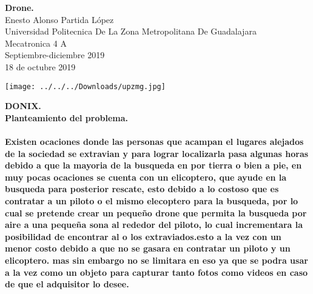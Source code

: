 \documentclass[12pt]{report}
\begin{document}
{\Large \textbf{Drone.}\\}
\Large{Enesto Alonso Partida López\\ Universidad Politecnica De La Zona Metropolitana De Guadalajara\\ Mecatronica 4 A\\ Septiembre-diciembre 2019}\\
{18 de octubre 2019 }\\

\begin{center}
\texttt{[image: ../../../Downloads/upzmg.jpg]} \\
\end{center}

\newpage
{\huge \textbf{DONIX.}}\\

{\huge \textbf{Planteamiento del problema.}}\\\\
{\large\textbf{ Existen ocaciones donde las personas que acampan el lugares alejados de la sociedad se extravian y para lograr localizarla pasa algunas horas debido a que la mayoria de la busqueda en por tierra o bien a pie, en muy pocas ocaciones se cuenta con un elicoptero, que ayude en la busqueda para posterior rescate, esto debido a lo costoso que es contratar a un piloto o el mismo elecoptero para la busqueda, por lo cual se pretende crear un pequeño drone que permita la busqueda por aire a una pequeña sona al rededor del piloto, lo cual incrementara la posibilidad de encontrar al o los extraviados.esto a la vez con un menor costo debido a que no se gasara en contratar un piloto y un elicoptero. mas sin embargo no se limitara en eso ya que se podra usar a la vez como un objeto para capturar tanto fotos como videos en caso de que el adquisitor lo desee.  }\\}
\end{document}
